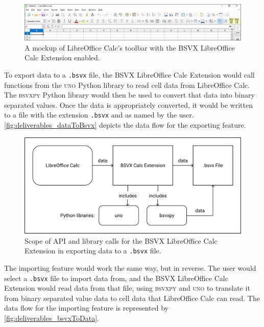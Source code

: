 \documentclass[10pt]{article}
\begin{document}
\begin{figure}[H]
\centering
\includegraphics[width=\textwidth]{figures/mockupPart3.png}
\caption{A mockup of LibreOffice Calc's toolbar with the BSVX LibreOffice Calc Extension enabled.}
\label{fig:deliverables_mockupPart3}
\end{figure}

\indent{}
To export data to a \texttt{.bsvx} file, the BSVX LibreOffice Calc Extension would call functions from the \textsc{uno} Python library to read cell data from LibreOffice Calc.
The \textsc{bsvxpy} Python library would then be used to convert that data into binary separated values.
Once the data is appropriately converted, it would be written to a file with the extension \texttt{.bsvx} and as named by the user.
\autoref{fig:deliverables_dataToBsvx} depicts the data flow for the exporting feature.

\begin{figure}[H]
\centering
\includegraphics[width=5in]{figures/dataToBsvx.png}
\caption{Scope of API and library calls for the BSVX LibreOffice Calc Extension in exporting data to a \texttt{.bsvx} file.}
\label{fig:deliverables_dataToBsvx}
\end{figure}

\indent{}
The importing feature would work the same way, but in reverse.
The user would select a \texttt{.bsvx} file to import data from, and the BSVX LibreOffice Calc Extension would read data from that file, using \textsc{bsvxpy} and \textsc{uno} to translate it from binary separated value data to cell data that LibreOffice Calc can read.
The data flow for the importing feature is represented by \autoref{fig:deliverables_bsvxToData}.
    
\end{document}
